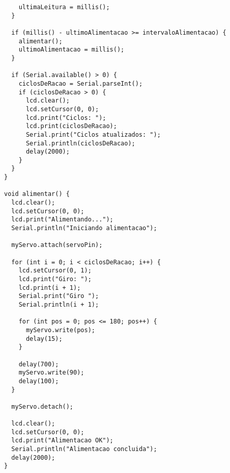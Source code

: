 \begin{verbatim}
    ultimaLeitura = millis();
  }

  if (millis() - ultimoAlimentacao >= intervaloAlimentacao) {
    alimentar();
    ultimoAlimentacao = millis();
  }

  if (Serial.available() > 0) {
    ciclosDeRacao = Serial.parseInt();
    if (ciclosDeRacao > 0) {
      lcd.clear();
      lcd.setCursor(0, 0);
      lcd.print("Ciclos: ");
      lcd.print(ciclosDeRacao);
      Serial.print("Ciclos atualizados: ");
      Serial.println(ciclosDeRacao);
      delay(2000);
    }
  }
}

void alimentar() {
  lcd.clear();
  lcd.setCursor(0, 0);
  lcd.print("Alimentando...");
  Serial.println("Iniciando alimentacao");

  myServo.attach(servoPin);

  for (int i = 0; i < ciclosDeRacao; i++) {
    lcd.setCursor(0, 1);
    lcd.print("Giro: ");
    lcd.print(i + 1);
    Serial.print("Giro ");
    Serial.println(i + 1);

    for (int pos = 0; pos <= 180; pos++) {
      myServo.write(pos);
      delay(15);
    }

    delay(700);
    myServo.write(90);
    delay(100);
  }

  myServo.detach();

  lcd.clear();
  lcd.setCursor(0, 0);
  lcd.print("Alimentacao OK");
  Serial.println("Alimentacao concluida");
  delay(2000);
} 
\end{verbatim}
